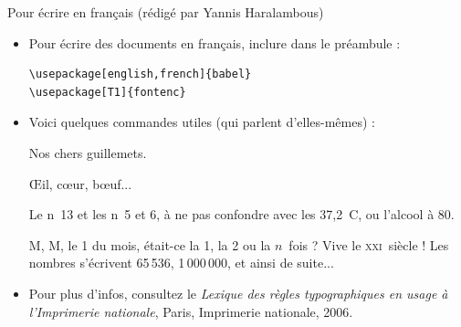 \documentclass{beamer}
\begin{document}
\begin{frame}[fragile]{Pour écrire en français (rédigé par Yannis Haralambous)}
\small
\begin{itemize}
\item Pour écrire des documents en français, inclure dans le préambule :
\begin{verbatim}
\usepackage[english,french]{babel}
\usepackage[T1]{fontenc}
\end{verbatim}
\item Voici quelques commandes utiles (qui parlent d'elles-mêmes) :
\begin{exampletwouptiny}
Nos chers \og{}guillemets\fg{}.

{\OE}il, c{\oe}ur, b{\oe}uf...

Le n~13 et les n~5 et 6,
à ne pas confondre avec les 
37,2~\textdegree C, ou l'alcool 
à 80\textdegree.

M, M, le 1
du mois, était-ce la 1, 
la 2 ou la $n$~fois ?
Vive le \textsc{xxi}~siècle !
Les nombres s'écrivent 65\,536,
1\,000\,000, et ainsi de suite...
\end{exampletwouptiny}
\item Pour plus d'infos, consultez le \emph{Lexique des règles typographiques en usage à l'Imprimerie nationale}, Paris, Imprimerie nationale, 2006.
\end{itemize}
\end{frame}
\end{document}
